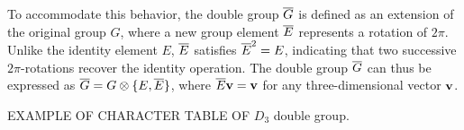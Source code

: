 To accommodate this behavior, the double group \(\overline{G}\) is defined as an extension of the original group \(G\), where a new group element \(\overline{E}\) represents a rotation of \(2\pi\). Unlike the identity element \(E\), \(\overline{E}\) satisfies $\overline{E}^2 = E$, indicating that two successive \(2\pi\)-rotations recover the identity operation. The double group \(\overline{G}\) can thus be expressed as $\overline{G} = G \otimes \{E, \overline{E}\}$, where \(\overline{E} {\vb{v}} = {\vb{v}}\) for any three-dimensional vector \({\vb{v}}\).

\begin{example} \label{ex:double_group_example}
EXAMPLE OF CHARACTER TABLE OF $D_3$ double group.
\end{example}








%



